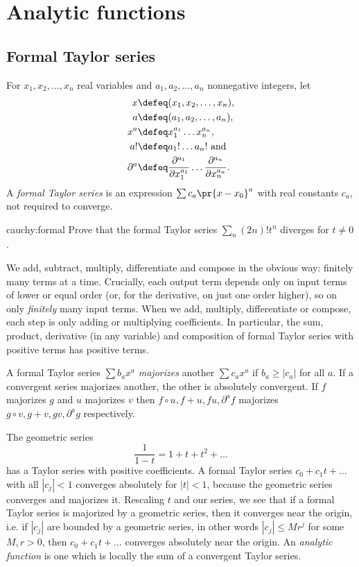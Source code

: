 \chapter{Analytic functions}\label{chapter:analytic.functions}%
%
\section{Formal Taylor series}
For \(x_1,x_2,\dots,x_n\) real variables and \(a_1,a_2,\dots,a_n\) nonnegative integers, let
\begin{align*}
x&\defeq(x_1,x_2,\dots,x_n),\\
a&\defeq(a_1,a_2,\dots,a_n),\\ 
x^a&\defeq x_1^{a_1} \dots x_n^{a_n},\\
a!&\defeq a_1!\dots a_n!\text{ and}\\ 
\partial^a&\defeq\frac{\partial^{a_1}}{\partial x_1^{a_1}} \dots \frac{\partial^{a_n}}{\partial x_n^{a_n}}.
\end{align*}
A \emph{formal Taylor series} is an expression \(\sum c_a \pr{x-x_0}^a\) with real constants \(c_a\), not required to converge.
\begin{problem}{cauchy:formal}
Prove that the formal Taylor series \(\sum_n (2n)! t^n\) diverges for \(t \ne 0\).
\end{problem}
We add, subtract, multiply, differentiate and compose in the obvious way: finitely many terms at a time.
Crucially, each output term depends only on input terms of lower or equal order (or, for the derivative, on just one order higher), so on only \emph{finitely} many input terms.
When we add, multiply, differentiate or compose, each step is only adding or multiplying coefficients.
In particular, the sum, product, derivative (in any variable) and composition of formal Taylor series with positive terms has positive terms.

A formal Taylor series \(\sum b_a x^a\) \emph{majorizes} another \(\sum c_a x^a\) if \(b_a \ge \left|c_a\right|\) for all \(a\).
If a convergent series majorizes another, the other is absolutely convergent.
If \(f\) majorizes \(g\) and \(u\) majorizes \(v\) then \(f \circ u, f+u, fu, \partial^a \! f\) majorizes \(g \circ v, g+v, gv, \partial^a \! g\) respectively. 

The geometric series
\[
 \frac{1}{1-t}=1+t+t^2+\dots
\]
has a Taylor series with positive coefficients.
A formal Taylor series \(c_0+c_1 t + \dots\) with all \(\left|c_j\right|<1\) converges absolutely for \(|t|<1\), because the geometric series converges and majorizes it.
Rescaling \(t\) and our series, we see that if a formal Taylor series is majorized by a geometric series, then it converges near the origin, i.e. if \(\left|c_j\right|\) are bounded by a geometric series, in other words \(\left|c_j\right| \le Mr^j\) for some \(M, r>0\), then \(c_0 + c_1 t + \dots\) converges absolutely near the origin.
An \emph{analytic function} is one which is locally the sum of a convergent Taylor series.

